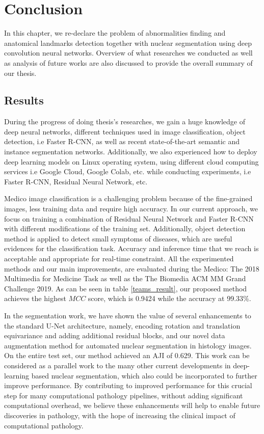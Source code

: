 \chapter{Conclusion}
\label{chap-conclusion}
\begin{ChapAbstract}
In this chapter, we re-declare the problem of abnormalities finding and anatomical landmarks detection together with nuclear segmentation using deep convolution neural networks. Overview of what researches we conducted as well as analysis of future works are also discussed to provide the overall summary of our thesis. 
\end{ChapAbstract}

\section{Results}
During the progress of doing thesis's researches, we gain a huge knowledge of deep neural networks, different techniques used in image classification, object detection, i.e Faster R-CNN, as well as recent state-of-the-art semantic and instance segmentation networks. Additionally, we also experienced how to deploy deep learning models on Linux operating system, using different cloud computing services i.e Google Cloud, Google Colab, etc. while conducting experiments, i.e Faster R-CNN, Residual Neural Network, etc.

Medico image classification is a challenging problem because of the fine-grained images, less training data and require high accuracy. In our current approach, we focus on training a combination of Residual Neural Network and Faster R-CNN with different modifications of the training set. Additionally, object detection method is applied to detect small symptoms of diseases, which are useful evidences for the classification task. Accuracy and inference time that we reach is acceptable and appropriate for real-time constraint. All the experimented methods and our main improvements, are evaluated during the Medico: The 2018 Multimedia for Medicine Task as well as the The Biomedia ACM MM Grand Challenge 2019. As can be seen in table \ref{teams_result}, our proposed method achieves the highest $MCC$ score, which is 0.9424 while the accuracy at 99.33\%.

In the segmentation work, we have shown the value of several enhancements to the standard U-Net architecture, namely, encoding rotation and translation equivariance and adding additional residual blocks, and our novel data augmentation
method for automated nuclear segmentation in histology
images. On the entire test set, our method
achieved an AJI of 0.629. This work can be considered as a parallel work to the many other current developments in deep-learning based nuclear segmentation, which also could be incorporated to further improve performance. By contributing to
improved performance for this crucial step for many computational pathology pipelines, without adding significant
computational overhead, we believe these enhancements
will help to enable future discoveries in pathology, with
the hope of increasing the clinical impact of computational
pathology.

